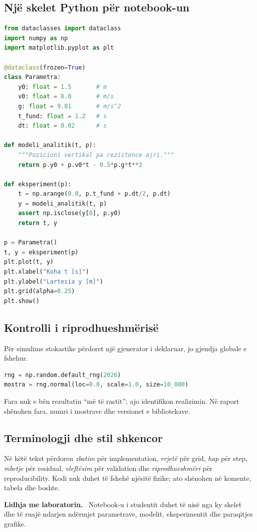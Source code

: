 \documentclass[11pt,oneside,openany]{book}
\newenvironment{lidhje}{\par\medskip\noindent\textbf{Lidhja me laboratorin.}\ }{\par\medskip}
\begin{document}
\subsection{Një skelet Python për notebook-un}
\begin{lstlisting}[language=Python,caption={Skelet minimal për një eksperiment numerik.}]
from dataclasses import dataclass
import numpy as np
import matplotlib.pyplot as plt

@dataclass(frozen=True)
class Parametra:
    y0: float = 1.5       # m
    v0: float = 8.0       # m/s
    g: float = 9.81       # m/s^2
    t_fund: float = 1.2   # s
    dt: float = 0.02      # s

def modeli_analitik(t, p):
    """Pozicioni vertikal pa rezistence ajri."""
    return p.y0 + p.v0*t - 0.5*p.g*t**2

def eksperiment(p):
    t = np.arange(0.0, p.t_fund + p.dt/2, p.dt)
    y = modeli_analitik(t, p)
    assert np.isclose(y[0], p.y0)
    return t, y

p = Parametra()
t, y = eksperiment(p)
plt.plot(t, y)
plt.xlabel("Koha t [s]")
plt.ylabel("Lartesia y [m]")
plt.grid(alpha=0.25)
plt.show()
\end{lstlisting}

\subsection{Kontrolli i riprodhueshmërisë}
Për simulime stokastike përdoret një gjenerator i deklaruar, jo gjendja globale e fshehur.
\begin{lstlisting}[language=Python]
rng = np.random.default_rng(2026)
mostra = rng.normal(loc=0.0, scale=1.0, size=10_000)
\end{lstlisting}
Fara nuk e bën rezultatin ``më të rastit''; ajo identifikon realizimin. Në raport shënohen fara, numri i mostrave dhe versionet e bibliotekave.

\subsection{Terminologji dhe stil shkencor}
Në këtë tekst përdoren \emph{zbatim} për implementation, \emph{rrjetë} për grid, \emph{hap} për step, \emph{mbetje} për residual, \emph{vleftësim} për validation dhe \emph{riprodhueshmëri} për reproducibility. Kodi nuk duhet të fshehë njësitë fizike; ato shënohen në komente, tabela dhe boshte.

\begin{lidhje}
Notebook-u i studentit duhet të nisë nga ky skelet dhe të ruajë ndarjen ndërmjet parametrave, modelit, eksperimentit dhe paraqitjes grafike.
\end{lidhje}
\end{document}
